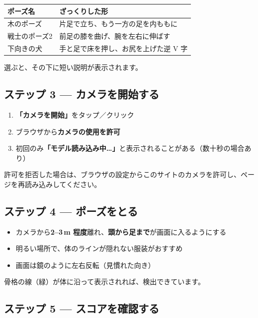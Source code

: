 \documentclass[a4paper,11pt]{ltjsarticle}
\begin{document}
\begin{table}[h]
  \centering
  \begin{tabular}{@{}ll@{}}
    \toprule
    ポーズ名 & ざっくりした形 \\
    \midrule
    木のポーズ & 片足で立ち、もう一方の足を内ももに \\
    戦士のポーズ2 & 前足の膝を曲げ、腕を左右に伸ばす \\
    下向きの犬 & 手と足で床を押し、お尻を上げた逆 V 字 \\
    \bottomrule
  \end{tabular}
\end{table}

選ぶと、その下に短い説明が表示されます。

\subsection{ステップ 3 --- カメラを開始する}

\begin{enumerate}
  \item \textbf{「カメラを開始」}をタップ／クリック
  \item ブラウザから\textbf{カメラの使用を許可}
  \item 初回のみ\textbf{「モデル読み込み中…」}と表示されることがある（数十秒の場合あり）
\end{enumerate}

許可を拒否した場合は、ブラウザの設定からこのサイトのカメラを許可し、ページを再読み込みしてください。

\subsection{ステップ 4 --- ポーズをとる}

\begin{itemize}
  \item カメラから\textbf{2--3\,m 程度}離れ、\textbf{頭から足まで}が画面に入るようにする
  \item 明るい場所で、体のラインが隠れない服装がおすすめ
  \item 画面は鏡のように左右反転（見慣れた向き）
\end{itemize}

骨格の線（緑）が体に沿って表示されれば、検出できています。

\subsection{ステップ 5 --- スコアを確認する}
\end{document}
